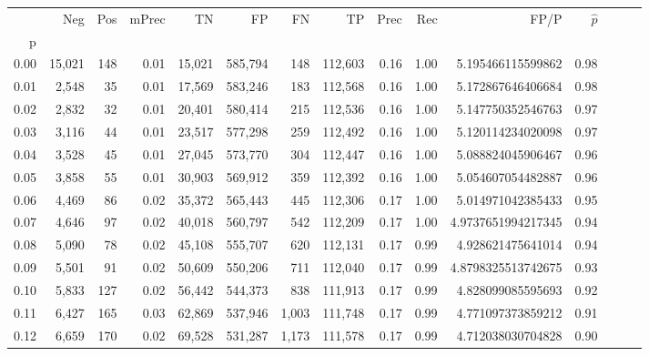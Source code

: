 \begin{tabular}{rrrrrrrrrrrrrrr}
\toprule
{} &     Neg &    Pos & mPrec &       TN &       FP &       FN &       TP &  Prec &   Rec &                  FP/P & $\hat{p}$ \\
p    &         &        &       &          &          &          &          &       &       &                       &           \\
\midrule
0.00 &  15,021 &    148 &  0.01 &   15,021 &  585,794 &      148 &  112,603 &  0.16 &  1.00 &     5.195466115599862 &      0.98 \\
0.01 &   2,548 &     35 &  0.01 &   17,569 &  583,246 &      183 &  112,568 &  0.16 &  1.00 &     5.172867646406684 &      0.98 \\
0.02 &   2,832 &     32 &  0.01 &   20,401 &  580,414 &      215 &  112,536 &  0.16 &  1.00 &     5.147750352546763 &      0.97 \\
0.03 &   3,116 &     44 &  0.01 &   23,517 &  577,298 &      259 &  112,492 &  0.16 &  1.00 &     5.120114234020098 &      0.97 \\
0.04 &   3,528 &     45 &  0.01 &   27,045 &  573,770 &      304 &  112,447 &  0.16 &  1.00 &     5.088824045906467 &      0.96 \\
0.05 &   3,858 &     55 &  0.01 &   30,903 &  569,912 &      359 &  112,392 &  0.16 &  1.00 &     5.054607054482887 &      0.96 \\
0.06 &   4,469 &     86 &  0.02 &   35,372 &  565,443 &      445 &  112,306 &  0.17 &  1.00 &     5.014971042385433 &      0.95 \\
0.07 &   4,646 &     97 &  0.02 &   40,018 &  560,797 &      542 &  112,209 &  0.17 &  1.00 &    4.9737651994217345 &      0.94 \\
0.08 &   5,090 &     78 &  0.02 &   45,108 &  555,707 &      620 &  112,131 &  0.17 &  0.99 &     4.928621475641014 &      0.94 \\
0.09 &   5,501 &     91 &  0.02 &   50,609 &  550,206 &      711 &  112,040 &  0.17 &  0.99 &    4.8798325513742675 &      0.93 \\
0.10 &   5,833 &    127 &  0.02 &   56,442 &  544,373 &      838 &  111,913 &  0.17 &  0.99 &     4.828099085595693 &      0.92 \\
0.11 &   6,427 &    165 &  0.03 &   62,869 &  537,946 &    1,003 &  111,748 &  0.17 &  0.99 &     4.771097373859212 &      0.91 \\
0.12 &   6,659 &    170 &  0.02 &   69,528 &  531,287 &    1,173 &  111,578 &  0.17 &  0.99 &     4.712038030704828 &      0.90 \\

\end{tabular}
